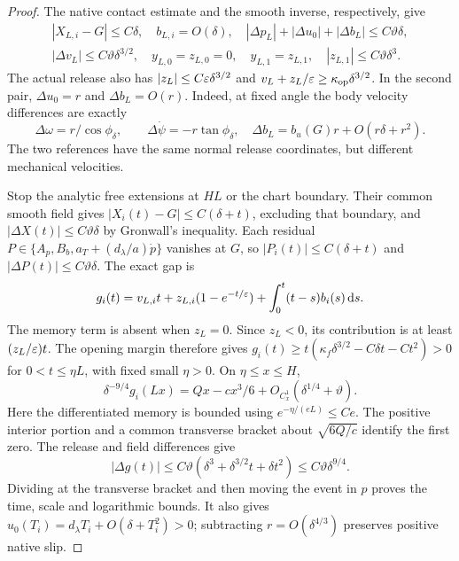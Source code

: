 \begin{proof}
The native contact estimate and the smooth inverse, respectively, give
\begin{equation}
 \begin{gathered}
 |X_{L,i}-G|\le C\delta,\quad b_{L,i}=O(\delta),\quad
 |\Delta p_L|+|\Delta u_0|+|\Delta b_L|\le C\vartheta\delta,\\
 |\Delta v_L|\le C\vartheta\delta^{3/2},\quad
 y_{L,0}=z_{L,0}=0,\quad y_{L,1}=z_{L,1},\quad
 |z_{L,1}|\le C\vartheta\delta^3.
 \end{gathered}\label{ret:paired-release-data}
\end{equation}
The actual release also has $|z_L|\le C\varepsilon\delta^{3/2}$ and
$v_L+z_L/\varepsilon\ge \kappa_{\rm op}\delta^{3/2}$. In the second pair,
$\Delta u_0=r$ and $\Delta b_L=O(r)$. Indeed, at fixed angle the
body velocity differences are exactly
\begin{equation}
 \Delta\omega=r/\cos\phi_\delta,\qquad
 \Delta\dot\psi=-r\tan\phi_\delta,
 \quad \Delta b_L=b_u(G)r+O(r\delta+r^2).
 \label{ret:body-shift}
\end{equation}
The two references have the same normal release coordinates, but
different mechanical velocities.

Stop the analytic free extensions at $HL$ or the chart boundary.
Their common smooth field gives
$|X_i(t)-G|\le C(\delta+t)$, excluding that boundary, and
$|\Delta X(t)|\le C\vartheta\delta$ by Gronwall's inequality.
Each residual $P\in\{A_p,B_b,a_T+(d_\lambda/a)\dot p\}$ vanishes at $G$,
so $|P_i(t)|\le C(\delta+t)$ and
$|\Delta P(t)|\le C\vartheta\delta$.
The exact gap is
\begin{equation}
 g_i(t)=v_{L,i}t+z_{L,i}(1-e^{-t/\varepsilon})
                  +\int_0^t(t-s)b_i(s)\,\mathrm d s.
 \label{ret:exact-free-gap}
\end{equation}
The memory term is absent when $z_L=0$. Since $z_L<0$, its
contribution is at least $(z_L/\varepsilon)t$. The opening margin therefore
gives $g_i(t)\ge t(\kappa_f\delta^{3/2}-C\delta t-Ct^2)>0$ for
$0<t\le\eta L$, with fixed small $\eta>0$.
On $\eta\le x\le H$,
\[
 \delta^{-9/4}g_i(Lx)
 =Qx-cx^3/6+O_{C^1_x}(\delta^{1/4}+\vartheta).
\]
Here the differentiated memory is bounded using
$e^{-\eta/(eL)}\le Ce$. The positive interior portion and a common
transverse bracket about $\sqrt{6Q/c}$ identify the first zero.
The release and field differences give
\[
 |\Delta g(t)|\le C\vartheta
 (\delta^3+\delta^{3/2}t+\delta t^2)
 \le C\vartheta\delta^{9/4}.
\]
Dividing at the transverse bracket and then moving the event in $p$
proves the time, scale and logarithmic bounds. It also gives
$u_0(T_i)=d_\lambda T_i+O(\delta+T_i^2)>0$; subtracting $r=O(\delta^{4/3})$
preserves positive native slip.


\end{proof}
